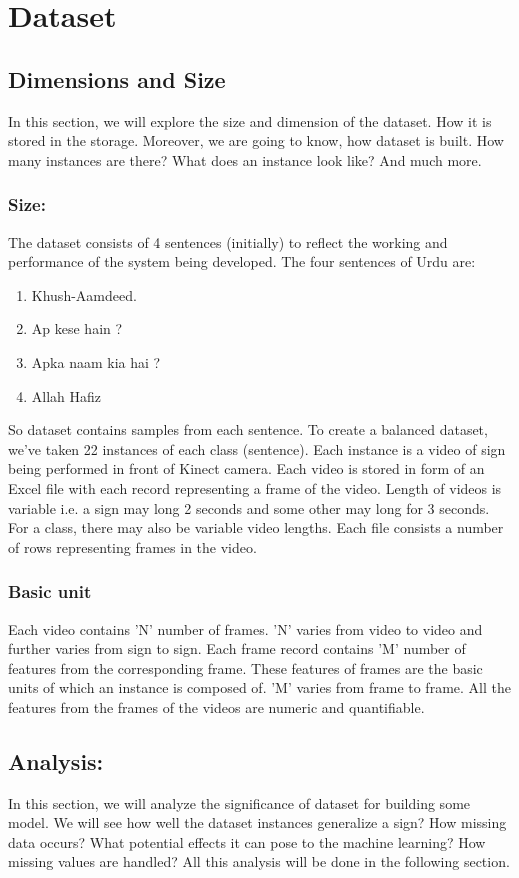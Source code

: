 \chapter{Dataset\label{ch:Dataset}}
\section{Dimensions and Size }
In this section, we will explore the size and dimension of the dataset. How it is stored in the storage. Moreover, we are going to know, how dataset is built. How many instances are there? What does an instance look like? And much more.
\subsection{ Size: }
The dataset consists of 4 sentences (initially) to reflect the working and performance of the system being developed. The four sentences of Urdu are:
\begin{enumerate}
  \item Khush-Aamdeed.
  \item Ap kese hain ?
  \item Apka naam kia hai ? 
  \item Allah Hafiz 
\end{enumerate}

So dataset contains samples from each sentence. To create a balanced dataset, we’ve taken 22 instances of each class (sentence). Each instance is a video of sign being performed in front of Kinect camera. Each video is stored in form of an Excel file with each record representing a frame of the video. Length of videos is variable i.e. a sign may long 2 seconds and some other may long for 3 seconds. For a class, there may also be variable video lengths. Each file consists a number of rows representing frames in the video.
\subsection{ Basic unit }
Each video contains 'N' number of frames. 'N' varies from video to video and further varies from sign to sign. Each frame record contains 'M' number of features from the corresponding frame. These features of frames are the basic units of which an instance is composed of. 'M' varies from frame to frame. All the features from the frames of the videos are numeric and quantifiable.

\section{ Analysis: }
In this section, we will analyze the significance of dataset for building some model. We will see how well the dataset instances generalize a sign? How missing data occurs? What potential effects it can pose to the machine learning? How missing values are handled? All this analysis will be done in the following section.
